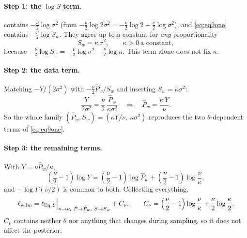 \documentclass[11pt,a4paper]{article}
\newcommand{\Pbar}{\hat{P}}
\begin{document}
\paragraph{Step 1: the $\log S$ term.}  contains
$-\frac\nu2\log\sigma^2$ (from $-\frac\nu2\log2\sigma^2=-\frac\nu2\log2-\frac\nu2\log\sigma^2$),
and \cref{eq:eq9one} contains $-\frac\nu2\log S_w$. They agree up to a constant for
\emph{any} proportionality
\[
  S_w = \kappa\,\sigma^2,\qquad \kappa>0\ \text{a constant},
\]
because $-\frac\nu2\log S_w = -\frac\nu2\log\sigma^2-\frac\nu2\log\kappa$. This term
alone does not fix $\kappa$.

\paragraph{Step 2: the data term.} Matching $-Y/(2\sigma^2)$ with
$-\frac\nu2\Pbar_w/S_w$ and inserting $S_w=\kappa\sigma^2$:
\[
  \frac{Y}{2\sigma^2} = \frac\nu2\,\frac{\Pbar_w}{\kappa\sigma^2}
  \quad\Longrightarrow\quad
  \Pbar_w = \frac{\kappa\,Y}{\nu}.
\]
So the whole family $(\Pbar_w,S_w)=(\kappa Y/\nu,\ \kappa\sigma^2)$ reproduces the two
$\theta$-dependent terms of \cref{eq:eq9one}.

\paragraph{Step 3: the remaining terms.} With $Y=\nu\Pbar_w/\kappa$,
\[
  \left(\frac\nu2-1\right)\log Y = \left(\frac\nu2-1\right)\log\Pbar_w
  + \left(\frac\nu2-1\right)\log\frac{\nu}{\kappa},
\]
and $-\log\Gamma(\nu/2)$ is common to both. Collecting everything,
\begin{equation}
  \ell_{\rm wdm} = \ell_{\rm Eq.\,9}\Big|_{n\to\nu,\ \Pbar\to\Pbar_w,\ S\to S_w} + C_\nu,
  \qquad
  C_\nu = \left(\frac\nu2-1\right)\log\frac\nu\kappa + \frac\nu2\log\frac{\kappa}{2}.
  \label{eq:wmatch}
\end{equation}
$C_\nu$ contains neither $\theta$ nor anything that changes during sampling, so it does
not affect the posterior.
\end{document}
